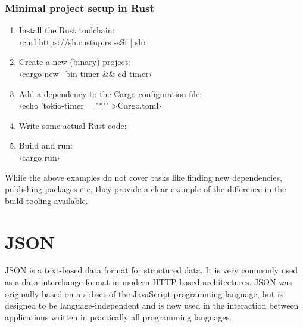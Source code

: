 
\subsubsection{Minimal project setup in Rust}

\begin{enumerate}
  \item Install the Rust toolchain:\\
        ‹curl https://sh.rustup.rs -sSf | sh›
  \item Create a new (binary) project:\\
        ‹cargo new --bin timer && cd timer›
  \item Add a dependency to the Cargo configuration file:\\
        ‹echo 'tokio-timer = "*"' >Cargo.toml›
  \item Write some actual Rust code:\\
  \item Build and run:\\
        ‹cargo run›
\end{enumerate}


While the above examples do not cover tasks like finding new dependencies, publishing packages etc, they provide a clear example of the difference in the build tooling available.


\section{JSON}
\label{sec:json}

JSON is a text-based data format for structured data. It is very commonly used as a data interchange format in modern HTTP-based architectures. JSON was originally based on a subset of the JavaScript programming language, but is designed to be language-independent and is now used in the interaction between applications written in practically all programming languages.

